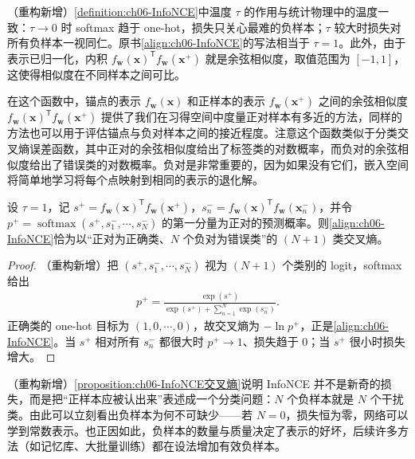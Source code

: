 \documentclass[../../main.tex]{subfiles}
\begin{document}
\begin{remark}（重构新增）\cref{definition:ch06-InfoNCE}中温度 $\tau$ 的作用与统计物理中的温度一致：$\tau\to0$ 时 softmax 趋于 one-hot，损失只关心最难的负样本；$\tau$ 较大时损失对所有负样本一视同仁。原书\eqref{align:ch06-InfoNCE}的写法相当于 $\tau=1$。此外，由于表示已归一化，内积 $f_{\boldsymbol{w}}(\boldsymbol{x})^{\mathsf T}f_{\boldsymbol{w}}(\boldsymbol{x}^{+})$ 就是余弦相似度，取值范围为 $[-1,1]$，这使得相似度在不同样本之间可比。
\end{remark}

在这个函数中，锚点的表示 $f_{\boldsymbol{w}}(\boldsymbol{x})$ 和正样本的表示 $f_{\boldsymbol{w}}(\boldsymbol{x}^{+})$ 之间的余弦相似度 $f_{\boldsymbol{w}}(\boldsymbol{x})^{\mathsf T}f_{\boldsymbol{w}}(\boldsymbol{x}^{+})$ 提供了我们在习得空间中度量正对样本有多近的方法，同样的方法也可以用于评估锚点与负对样本之间的接近程度。注意这个函数类似于分类交叉熵误差函数，其中正对的余弦相似度给出了标签类的对数概率，而负对的余弦相似度给出了错误类的对数概率。负对是非常重要的，因为如果没有它们，嵌入空间将简单地学习将每个点映射到相同的表示的退化解。

\begin{proposition}\label{proposition:ch06-InfoNCE交叉熵}
设 $\tau=1$，记 $s^{+}=f_{\boldsymbol{w}}(\boldsymbol{x})^{\mathsf T}f_{\boldsymbol{w}}(\boldsymbol{x}^{+})$，$s_n^{-}=f_{\boldsymbol{w}}(\boldsymbol{x})^{\mathsf T}f_{\boldsymbol{w}}(\boldsymbol{x}_n^{-})$，并令 $p^{+}=\operatorname{softmax}(s^{+},s_1^{-},\cdots,s_N^{-})$ 的第一分量为正对的预测概率。则\eqref{align:ch06-InfoNCE}恰为以“正对为正确类、$N$ 个负对为错误类”的 $(N+1)$ 类交叉熵。
\end{proposition}

\begin{proof}
（重构新增）把 $(s^{+},s_1^{-},\cdots,s_N^{-})$ 视为 $(N+1)$ 个类别的 logit，softmax 给出
\begin{align}
p^{+}=\frac{\exp(s^{+})}{\exp(s^{+})+\sum_{n=1}^{N}\exp(s_n^{-})}.
\end{align}
正确类的 one-hot 目标为 $(1,0,\cdots,0)$，故交叉熵为 $-\ln p^{+}$，正是\eqref{align:ch06-InfoNCE}。当 $s^{+}$ 相对所有 $s_n^{-}$ 都很大时 $p^{+}\to1$、损失趋于 $0$；当 $s^{+}$ 很小时损失增大。
\end{proof}

\begin{remark}（重构新增）\cref{proposition:ch06-InfoNCE交叉熵}说明 InfoNCE 并不是新奇的损失，而是把“正样本应被认出来”表述成一个分类问题：$N$ 个负样本就是 $N$ 个干扰类。由此可以立刻看出负样本为何不可缺少——若 $N=0$，损失恒为零，网络可以学到常数表示。也正因如此，负样本的数量与质量决定了表示的好坏，后续许多方法（如记忆库、大批量训练）都在设法增加有效负样本。
\end{remark}
\end{document}
